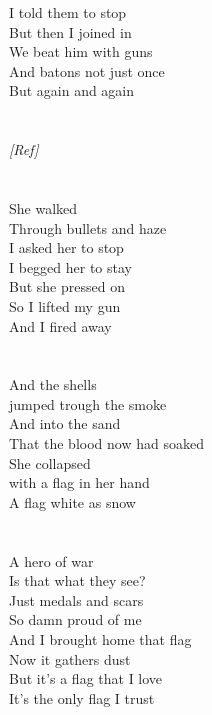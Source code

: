 {{I told them to stop\\
But then I joined in\\
We beat him with guns\\
And batons not just once\\
But again and again}\\
\\\noindent\vbox{~\\
\emph{[Ref]}}\\
\\\noindent\vbox{~\\
She walked\\
Through bullets and haze\\
I asked her to stop\\
I begged her to stay\\
But she pressed on\\
So I lifted my gun\\
And I fired away}\\
\\\noindent\vbox{~\\
And the shells\\
jumped trough the smoke\\
And into the sand\\
That the blood now had soaked\\
She collapsed\\
with a flag in her hand\\
A flag white as snow}\\
\\\noindent\vbox{~\\
A hero of war\\
Is that what they see?\\
Just medals and scars\\
So damn proud of me\\
And I brought home that flag\\
Now it gathers dust\\
But it's a flag that I love\\
It's the only flag I trust}
}


